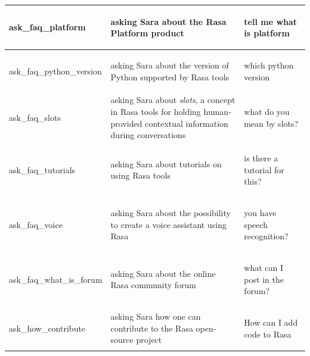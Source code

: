 \documentclass[bsc,frontabs,twoside,singlespacing,parskip,deptreport]{infthesis}
\begin{document}
{\begin{center}
\begin{longtable}{p{}|p{}|p{}}
    \hline
    \begin{spverbatim}ask_faq_platform\end{spverbatim} & asking Sara about the Rasa Platform product & \begin{spverbatim}tell me what is platform\end{spverbatim} \\
    \hline
    \begin{spverbatim}ask_faq_python_version\end{spverbatim} & asking Sara about the version of Python supported by Rasa tools & \begin{spverbatim}which python version\end{spverbatim} \\
    \hline
    \begin{spverbatim}ask_faq_slots\end{spverbatim} & asking Sara about \textit{slots}, a concept in Rasa tools for holding human-provided contextual information during conversations & \begin{spverbatim}what do you mean by slots?\end{spverbatim} \\
    \hline
    \begin{spverbatim}ask_faq_tutorials\end{spverbatim} & asking Sara about tutorials on using Rasa tools & \begin{spverbatim}is there a tutorial for this?\end{spverbatim} \\
    \hline
    \begin{spverbatim}ask_faq_voice\end{spverbatim} & asking Sara about the possibility to create a voice assistant using Rasa & \begin{spverbatim}you have speech recognition?\end{spverbatim} \\
    \hline
    \begin{spverbatim}ask_faq_what_is_forum\end{spverbatim} & asking Sara about the online Rasa community forum & \begin{spverbatim}what can I post in the forum?\end{spverbatim} \\
    \hline
    \begin{spverbatim}ask_how_contribute\end{spverbatim} & asking Sara how one can contribute to the Rasa open-source project & \begin{spverbatim}How can I add code to Rasa\end{spverbatim} \\

\end{longtable}
\end{center}}
\end{document}

